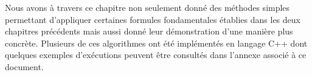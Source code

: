   
  
  Nous avons à travers ce chapitre non seulement donné des méthodes simples permettant d'appliquer certaines formules fondamentales établies dans les deux chapitres précédents mais  aussi donné  leur démonstration d'une manière  plus concrète. Plusieurs de ces algorithmes ont été implémentés en langage C++ dont quelques exemples d'exécutions peuvent être consultés dans l'annexe associé à ce document.